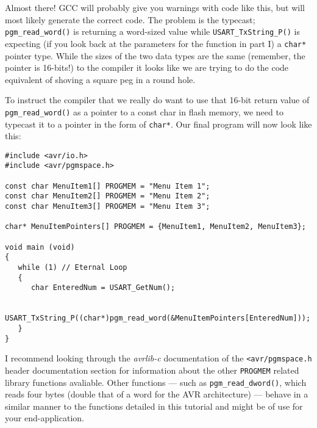 \documentclass[a4paper,oneside,notitlepage]{book}
\begin{document}
Almost there! GCC will probably give you warnings with code like this, but will most likely generate the correct code. The problem is the typecast; \lstinline{pgm_read_word()} is returning a word-sized value while \lstinline{USART_TxString_P()} is expecting (if you look back at the parameters for the function in part I) a \lstinline{char*} pointer type. While the sizes of the two data types are the same (remember, the pointer is 16-bits!) to the compiler it looks like we are trying to do the code equivalent of shoving a square peg in a round hole.

To instruct the compiler that we really do want to use that 16-bit return value of \lstinline{pgm_read_word()} as a pointer to a const char in flash memory, we need to typecast it to a pointer in the form of \lstinline{char*}. Our final program will now look like this:

\begin{center}
\begin{lstlisting}
#include <avr/io.h>
#include <avr/pgmspace.h>

const char MenuItem1[] PROGMEM = "Menu Item 1";
const char MenuItem2[] PROGMEM = "Menu Item 2";
const char MenuItem3[] PROGMEM = "Menu Item 3";

char* MenuItemPointers[] PROGMEM = {MenuItem1, MenuItem2, MenuItem3};

void main (void)
{
   while (1) // Eternal Loop
   {
      char EnteredNum = USART_GetNum();

      USART_TxString_P((char*)pgm_read_word(&MenuItemPointers[EnteredNum]));
   }
}
\end{lstlisting}
\end{center}

I recommend looking through the \textit{avrlib-c} documentation of the \lstinline{<avr/pgmspace.h} header documentation section for information about the other \lstinline{PROGMEM} related library functions avaliable. Other functions --- such as \lstinline{pgm_read_dword()}, which reads four bytes (double that of a word for the AVR architecture) --- behave in a similar manner to the functions detailed in this tutorial and might be of use for your end-application.
\end{document}
